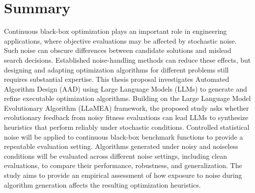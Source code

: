 
\chapter*{Summary}

Continuous black-box optimization plays an important role in engineering
applications, where objective evaluations may be affected by stochastic
noise. Such noise can obscure differences between candidate solutions
and mislead search decisions. Established noise-handling methods can
reduce these effects, but designing and adapting optimization algorithms
for different problems still requires substantial expertise. This thesis
proposal investigates Automated Algorithm Design (AAD) using Large
Language Models (LLMs) to generate and refine executable optimization
algorithms. Building on the Large Language Model Evolutionary Algorithm
(LLaMEA) framework, the proposed study asks whether evolutionary feedback
from noisy fitness evaluations can lead LLMs to synthesize heuristics
that perform reliably under stochastic conditions. Controlled statistical noise will
be applied to continuous black-box benchmark functions to provide a
repeatable evaluation setting. Algorithms generated under noisy and
noiseless conditions will be evaluated across different noise settings,
including clean evaluations, to compare their performance, robustness,
and generalization. The study aims to provide an empirical assessment of how exposure to noise during algorithm generation affects the resulting
optimization heuristics.
